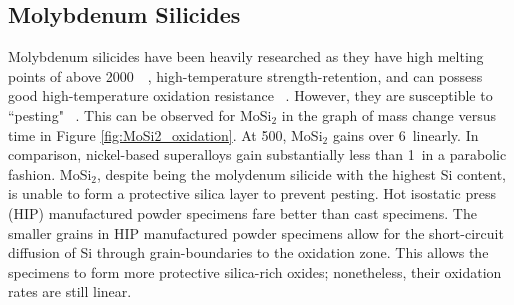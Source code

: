 %



%
 			
\subsection{Molybdenum Silicides}\label{subsection:MoSis}

Molybdenum silicides have been heavily researched as they have high melting points of above 2000\celsius\ ~\cite{svechnikov70}, high-temperature strength-retention, and can possess good high-temperature oxidation resistance ~\cite{brady00, mitra06, raj95a,  ochiai06}.  However, they are susceptible to ``pesting" ~\cite{inui00, ochiai06, shah92, yanagihara96}.  This can be observed for MoSi$_2$ in the graph of mass change versus time in Figure \ref{fig:MoSi2_oxidation}.  At 500\celsius, MoSi$_2$ gains over 6\milli \gram\usk\centi\rpcubic\meter\ linearly.  In comparison, nickel-based superalloys gain substantially less than 1\milli \gram\usk\centi\rpcubic\meter\ in a parabolic fashion.  MoSi$_2$, despite being the molydenum silicide with the highest Si content, is unable to form a protective silica layer to prevent pesting.  Hot isostatic press (HIP) manufactured powder specimens fare better than cast specimens.  The smaller grains in HIP manufactured powder specimens allow for the short-circuit diffusion of Si through grain-boundaries to the oxidation zone.  This allows the specimens to form more protective silica-rich oxides; nonetheless, their oxidation rates are still linear.

